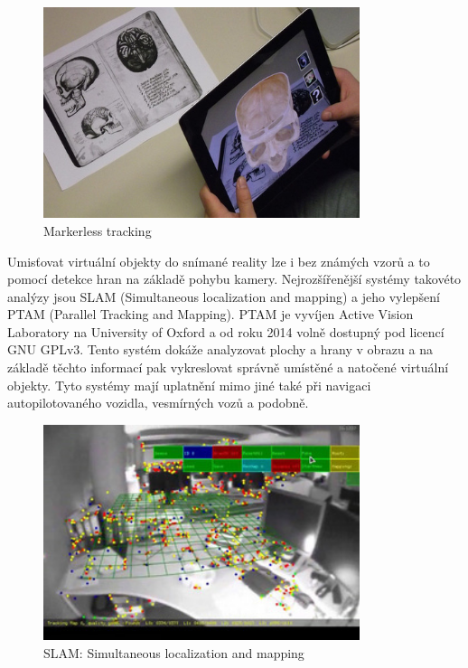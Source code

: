 \documentclass[twoside,12pt]{article}
\begin{document}
\begin{figure}[H]
    \includegraphics[width=350px, center]{images/markerless-tracking.jpg}
    \caption{Markerless tracking}
    \label{markerless_tracking}
\end{figure}

Umisťovat virtuální objekty do snímané reality lze i bez známých vzorů a to pomocí detekce hran na základě pohybu kamery. Nejrozšířenější systémy takovéto analýzy jsou SLAM (Simultaneous localization and mapping) a jeho vylepšení PTAM (Parallel Tracking and Mapping). PTAM je vyvíjen Active Vision Laboratory na University of Oxford a od roku 2014 volně dostupný pod licencí GNU GPLv3. Tento systém dokáže analyzovat plochy a hrany v obrazu a na základě těchto informací pak vykreslovat správně umístěné a natočené virtuální objekty. Tyto systémy mají uplatnění mimo jiné také při navigaci autopilotovaného vozidla, vesmírných vozů a podobně.

\begin{figure}[H]
    \includegraphics[width=350px, center]{images/slam.jpg}
    \caption{SLAM: Simultaneous localization and mapping}
    \label{slam}
\end{figure}


%
%
\end{document}
